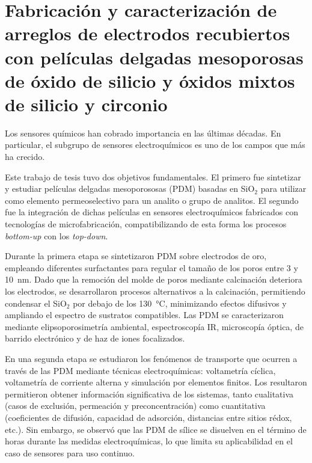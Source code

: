 \cleardoublepage

\mtcaddchapter[Resumen]

\section*{\centering\large{\bfseries{Fabricación y caracterización de arreglos de electrodos recubiertos con películas delgadas mesoporosas de óxido de silicio y óxidos mixtos de silicio y circonio}}}

\vspace*{\fill}

Los sensores químicos han cobrado importancia en las últimas décadas. En particular, el subgrupo de sensores electroquímicos es uno de los campos que más ha crecido. 

Este trabajo de tesis tuvo dos objetivos fundamentales. El primero fue sintetizar y estudiar películas delgadas mesoporososas (PDM) basadas en SiO$_2$ para utilizar como elemento permeoselectivo para un analito o grupo de analitos. El segundo fue la integración de dichas películas en sensores electroquímicos fabricados con tecnologías de microfabricación, compatibilizando de esta forma los procesos \textit{bottom-up} con los \textit{top-down}.

Durante la primera etapa se sintetizaron PDM sobre electrodos de oro, empleando diferentes surfactantes para regular el tamaño de los poros entre 3 y \SI{10}{\nm}. Dado que la remoción del molde de poros mediante calcinación deteriora los electrodos, se desarrollaron procesos alternativos a la calcinación, permitiendo condensar el SiO$_2$ por debajo de los \SI{130}{\celsius}, minimizando efectos difusivos y ampliando el espectro de sustratos compatibles. Las PDM se caracterizaron mediante elipsoporosimetría ambiental, espectroscopía IR, microscopía óptica, de barrido electrónico y de haz de iones focalizados.

En una segunda etapa se estudiaron los fenómenos de transporte que ocurren a través de las PDM mediante técnicas electroquímicas: voltametría cíclica, voltametría de corriente alterna y simulación por elementos finitos. Los resultaron permitieron obtener información significativa de los sistemas, tanto cualitativa (casos de exclusión, permeación y preconcentración) como cuantitativa (coeficientes de difusión, capacidad de adsorción, distancias entre sitios rédox, etc.). Sin embargo, se observó que las PDM de sílice se disuelven en el término de horas durante las medidas electroquímicas, lo que limita su aplicabilidad en el caso de sensores para uso continuo.

